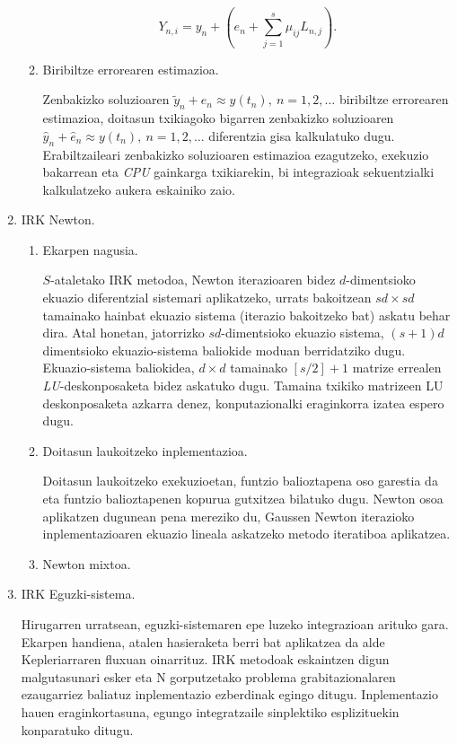 \begin{enumerate}
\begin{enumerate}
\begin{equation*}
Y_{n,i}=y_n + \left(e_n+ \sum_{j=1}^{s}\mu_{ij} L_{n,j} \right).
\end{equation*}
  
\item Biribiltze errorearen estimazioa.

Zenbakizko soluzioaren $\tilde{y}_n+e_n \approx y(t_n), \ n=1,2,\dots$ biribiltze errorearen estimazioa, doitasun txikiagoko bigarren zenbakizko soluzioaren $\hat{y}_n+\hat{e}_n \approx y(t_n), \ n=1,2,\dots$  diferentzia gisa kalkulatuko dugu.
Erabiltzaileari zenbakizko soluzioaren estimazioa ezagutzeko, exekuzio bakarrean  eta \emph{CPU} gainkarga txikiarekin, bi integrazioak sekuentzialki kalkulatzeko aukera eskainiko zaio. 


\end{enumerate}


\item IRK Newton.

\begin{enumerate}
\item Ekarpen nagusia.

$S$-ataletako IRK metodoa,  Newton iterazioaren bidez $d$-dimentsioko ekuazio diferentzial  sistemari aplikatzeko, urrats bakoitzean $sd \times sd$ tamainako hainbat ekuazio sistema (iterazio bakoitzeko bat) askatu behar dira. Atal honetan, jatorrizko $sd$-dimentsioko ekuazio sistema, $(s+1)d$ dimentsioko ekuazio-sistema baliokide moduan berridatziko dugu. Ekuazio-sistema baliokidea,  $d \times d$ tamainako $[s/2]+1$ matrize errealen \emph{LU}-deskonposaketa bidez askatuko dugu. Tamaina txikiko matrizeen LU deskonposaketa azkarra denez, konputazionalki eraginkorra izatea espero dugu.   

\item Doitasun laukoitzeko inplementazioa.

Doitasun laukoitzeko exekuzioetan, funtzio balioztapena oso garestia da eta funtzio balioztapenen kopurua gutxitzea bilatuko dugu. Newton osoa aplikatzen dugunean pena mereziko du, Gaussen Newton iterazioko inplementazioaren ekuazio lineala askatzeko metodo iteratiboa aplikatzea. 

\item Newton mixtoa.


\end{enumerate}
  

\item IRK Eguzki-sistema.

Hirugarren urratsean, eguzki-sistemaren epe luzeko integrazioan arituko gara. Ekarpen handiena, atalen hasieraketa berri bat aplikatzea da alde Kepleriarraren fluxuan oinarrituz. IRK metodoak eskaintzen digun malgutasunari esker eta N gorputzetako problema grabitazionalaren ezaugarriez baliatuz inplementazio ezberdinak egingo ditugu. Inplementazio hauen eraginkortasuna, egungo integratzaile sinplektiko esplizituekin konparatuko ditugu.


\end{enumerate}
